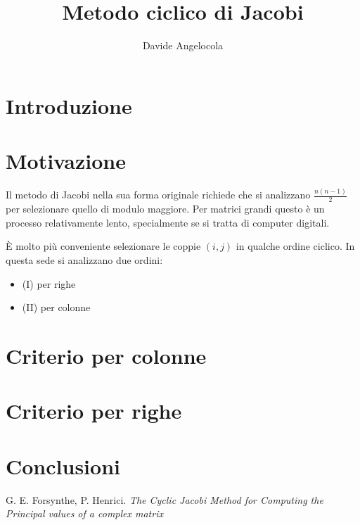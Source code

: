 \documentclass{article}
\title{Metodo ciclico di Jacobi}
\author{Davide Angelocola}
\begin{document}
\maketitle

\section{Introduzione}



\section{Motivazione}

Il metodo di Jacobi nella sua forma originale richiede che si
analizzano $\frac{n (n - 1)}{2}$ per selezionare quello di modulo
maggiore. Per matrici grandi questo \`{e} un processo relativamente
lento, specialmente se si tratta di computer digitali.

\`{E} molto pi\`{u} conveniente selezionare le coppie $(i, j)$ in
qualche ordine ciclico. In questa sede si analizzano due ordini:

\begin{itemize}
\item (I) per righe
\item (II) per colonne
\end{itemize}



\section{Criterio per colonne}
\section{Criterio per righe}
\section{Conclusioni}

\begin{thebibliography}{99}
 G. E. Forsynthe, P. Henrici. \textit{The Cyclic
    Jacobi Method for Computing the Principal values of a complex
    matrix}
\end{thebibliography}
\end{document}
